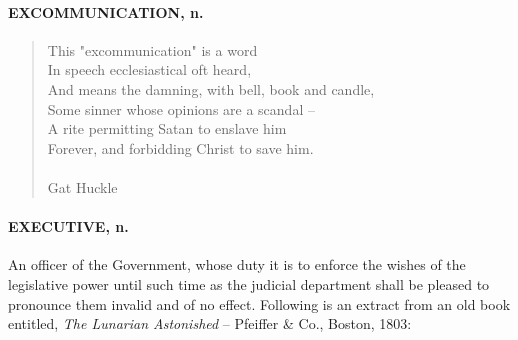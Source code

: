 \documentclass[11pt]{article}
\begin{document}
\paragraph{EXCOMMUNICATION, n.}

\begin{quote}   This "excommunication" is a word \\
  In speech ecclesiastical oft heard, \\
  And means the damning, with bell, book and candle, \\
  Some sinner whose opinions are a scandal -- \\
  A rite permitting Satan to enslave him \\
  Forever, and forbidding Christ to save him. \\
 \\
Gat Huckle \end{quote}


\paragraph{EXECUTIVE, n.}  An officer of the Government, whose duty it is to
enforce the wishes of the legislative power until such time as the
judicial department shall be pleased to pronounce them invalid and of
no effect.  Following is an extract from an old book entitled, {\em The
Lunarian Astonished} -- Pfeiffer \& Co., Boston, 1803:
\end{document}
